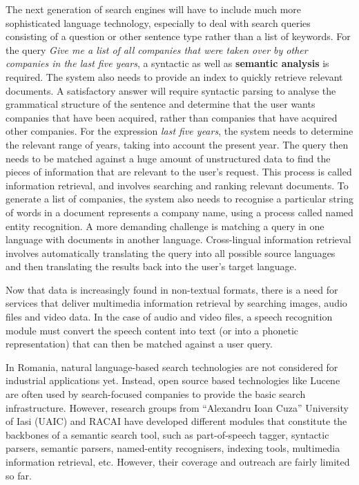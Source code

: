 \begin{multicols}{2}
The next generation of search engines will have to include much more sophisticated language technology, especially to deal with search queries consisting of a question or other sentence type rather than a list of keywords. For the query \textit{Give me a list of all companies that were taken over by other companies in the last five years}, a syntactic as well as \textbf{semantic analysis} is required. The system also needs to provide an index to quickly retrieve relevant documents. A satisfactory answer will require syntactic parsing to analyse the grammatical structure of the sentence and determine that the user wants companies that have been acquired, rather than companies that have acquired other companies. For the expression \textit{last five years}, the system needs to determine the relevant range of years, taking into account the present year. The query then needs to be matched against a huge amount of unstructured data to find the pieces of information that are relevant to the user’s request. This process is called information retrieval, and involves searching and ranking relevant documents. To generate a list of companies, the system also needs to recognise a particular string of words in a document represents a company name, using a process called named entity recognition. A more demanding challenge is matching a query in one language with documents in another language. Cross-lingual information retrieval involves automatically translating the query into all possible source languages and then translating the results back into the user's target language.

Now that data is increasingly found in non-textual formats, there is a need for services that deliver multimedia information retrieval by searching images, audio files and video data. In the case of audio and video files, a speech recognition module must convert the speech content into text (or into a phonetic representation) that can then be matched against a user query.

In Romania, natural language-based search technologies are not considered for industrial applications yet. Instead, open source based technologies like Lucene are often used by search-focused companies to provide the basic search infrastructure. However, research groups from “Alexandru Ioan Cuza” University of Iasi (UAIC) and RACAI have developed different modules that constitute the backbones of a semantic search tool, such as part-of-speech tagger, syntactic parsers, semantic parsers, named-entity recognisers, indexing tools, multimedia information retrieval, etc. However, their coverage and outreach are fairly limited so far.


\end{multicols}
